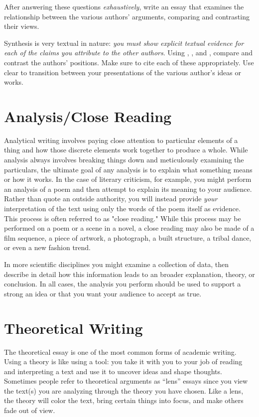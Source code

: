 \noindent After answering these questions \emph{exhaustively}, write an essay
that examines the relationship between the various authors’ arguments, comparing
and contrasting their views.


Synthesis is very textual in nature: \emph{you must show explicit textual
evidence for each of the claims you attribute to the other authors}. Using
\hyperlink{summary}{\color{Ahrenge}{summary}},
\hyperlink{paraphrase}{\color{Ahrenge}{paraphrase}}, and
\hyperlink{quotation}{\color{Ahrenge}{quotation}}, compare and contrast the
authors’ positions. Make sure to cite each of these appropriately. Use clear
\hyperlink{signalphrase}{\color{Ahrenge}{signal phrases}} to transition between
your presentations of the various author’s ideas or works.




\hypertarget{closereadingessay}{} \section{Analysis/Close Reading} Analytical
writing involves paying close attention to particular elements of a thing and
how those discrete elements work together to produce a whole. While analysis
always involves breaking things down and meticulously examining the particulars,
the ultimate goal of any analysis is to explain what something means or how it
works. In the case of literary criticism, for example, you might perform an analysis of a
poem and then attempt to explain its meaning to your audience.  Rather than
quote an outside authority, you will instead provide \emph{your} interpretation
of the text using only the words of the poem itself as evidence. This process is
often referred to as "close reading." While this process may be performed on a
poem or a scene in a novel, a close reading may also be made of a film
sequence, a piece of artwork, a photograph, a built structure, a tribal dance, or
even a new fashion trend.

In more scientific disciplines you might examine a collection of data, then
describe in detail how this information leads to an broader explanation, theory,
or conclusion. In all cases, the analysis you perform should be used to support
a strong \textemdash an idea or that you want your audience to accept as
true.

\hypertarget{theoreticalessay}{} \section{Theoretical Writing} The theoretical
essay is one of the most common forms of academic writing. Using a theory is
like using a tool: you take it with you to your job of reading and interpreting
a text and use it to uncover ideas and shape thoughts. Sometimes people refer to
theoretical arguments as “lens” essays since you view the text(s) you are
analyzing through the theory you have chosen. Like a lens, the theory will color
the text, bring certain things into focus, and make others fade out of view.

